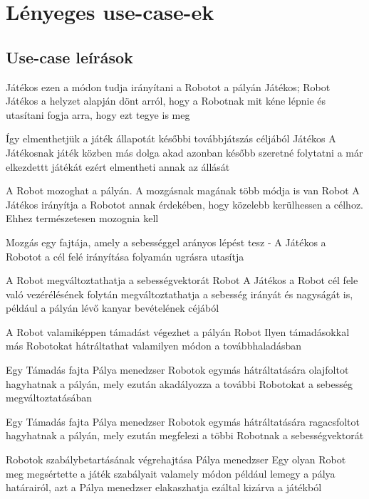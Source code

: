 \section{Lényeges use-case-ek}

\subsection{Use-case leírások}

%
{Játékos ezen a módon tudja irányítani a Robotot a pályán}%
{Játékos; Robot}%
{Játékos a helyzet alapján dönt arról, hogy a Robotnak mit kéne lépnie és utasítani fogja arra, hogy ezt tegye is meg}

%
{Így elmenthetjük a játék állapotát későbbi továbbjátszás céljából}%
{Játékos}%
{A Játékosnak játék közben más dolga akad azonban később szeretné folytatni a már elkezdettt játékát ezért elmentheti annak az állását}

%
{A Robot mozoghat a pályán. A mozgásnak magának több módja is van}
{Robot}
{A Játékos irányítja a Robotot annak érdekében, hogy közelebb kerülhessen a célhoz. Ehhez természetesen mozognia kell}

%
{Mozgás egy fajtája, amely a sebességgel arányos lépést tesz}%
{-}%
{A Játékos a Robotot a cél felé irányítása folyamán ugrásra utasítja}

%
{A Robot megváltoztathatja a sebességvektorát}%
{Robot}%
{A Játékos a Robot cél fele való vezérélésének folytán megváltoztathatja a sebesség irányát és nagyságát is, például a pályán lévő kanyar bevételének céjából}

%
{A Robot valamiképpen támadást végezhet a pályán}%
{Robot}%
{Ilyen támadásokkal más Robotokat hátráltathat valamilyen módon a továbbhaladásban}

%
{Egy Támadás fajta}%
{Pálya menedzser}%
{Robotok egymás hátráltatására olajfoltot hagyhatnak a pályán, mely ezután akadályozza a további Robotokat a sebesség megváltoztatásában}

%
{Egy Támadás fajta}%
{Pálya menedzser}%
{Robotok egymás hátráltatására ragacsfoltot hagyhatnak a pályán, mely ezután megfelezi a többi Robotnak a sebességvektorát}

%
{Robotok szabálybetartásának végrehajtása}%
{Pálya menedzser}%
{Egy olyan Robot meg megsértette a játék szabályait valamely módon például lemegy a pálya határairól, azt a Pálya menedzser elakaszhatja ezáltal kizárva a játékból}

